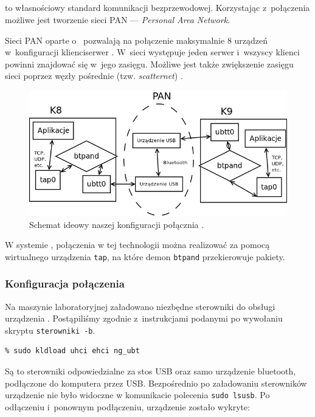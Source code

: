 \subsection{\bt}
\label{sec:bt}

\bt{} to własnościowy standard komunikacji bezprzewodowej. Korzystając
z~połączenia \bt{} możliwe jest tworzenie sieci PAN --- \emph{Personal Area
Network}.

Sieci PAN oparte o~\bt{} pozwalają na połączenie maksymalnie 8 urządzeń
w~konfiguracji klienci\dywiz serwer \cite{wiki:pan}. W~sieci występuje jeden
serwer i~wszyscy klienci powinni znajdować się w~jego zasięgu. Możliwe jest
także zwiększenie zasięgu sieci poprzez węzły pośrednie (tzw.
\emph{scatternet}) \cite{bt}.

\begin{figure}[h!]
  \centering
  \includegraphics[width=\textwidth]{figury/schemat-bluetooth.png}
  \caption{Schemat ideowy naszej konfiguracji połącznia \bt.}
\end{figure}

W systemie \bsd, połączenia w tej technologii można realizować za pomocą
wirtualnego urządzenia \texttt{tap}, na które demon \texttt{btpand}
przekierowuje pakiety.

\subsubsection{Konfiguracja połączenia}

Na maszynie laboratoryjnej załadowano niezbędne sterowniki do obsługi
urządzenia \bt. Postąpiliśmy zgodnie z~instrukcjami podanymi po wywołaniu
skryptu \texttt{sterowniki -b}.

\begin{lstlisting}
% sudo kldload uhci ehci ng_ubt
\end{lstlisting}

Są to sterowniki odpowiedzialne za stos USB oraz samo urządzenie bluetooth,
podłączone do komputera przez USB. Bezpośrednio po załadowaniu sterowników
urządzenie nie było widoczne w komunikacie polecenia \texttt{sudo lsusb}. Po
odłączeniu i~ponownym podłączeniu, urządzenie zostało wykryte:


